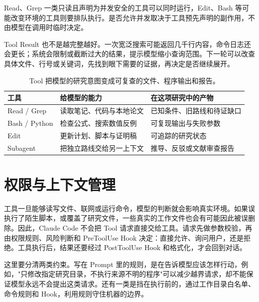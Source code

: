 Read、Grep 一类只读且声明为并发安全的工具可以同时运行，Edit、Bash 等可能改变环境的工具则要排队执行。是否允许并发取决于工具预先声明的副作用，不由模型在调用时临时决定。\cite{ch03inside}

Tool Result 也不是越完整越好。一次宽泛搜索可能返回几千行内容，命令日志还会更长；系统会限制或截断过大的结果，提示模型缩小查询范围。下一轮可以改查具体文件、行号或关键词，先找到眼下需要的证据，再决定是否继续展开。

\begin{table}[htbp]
\centering
\small
\setlength{\tabcolsep}{5pt}
\begin{tabular}{L{0.16\textwidth}L{0.30\textwidth}L{0.44\textwidth}}
\toprule
工具 & 给模型的能力 & 在这项研究中的产物 \\
\midrule
Read / Grep & 读取笔记、代码与本地论文 & 已知条件、旧路线和待证缺口 \\
Bash / Python & 检查公式、搜索数值反例 & 可复现输出与失败参数 \\
Edit & 更新计划、脚本与证明稿 & 可追踪的研究状态 \\
Subagent & 把独立路线交给另一上下文 & 推导、反驳或文献审查报告 \\
\bottomrule
\end{tabular}
\caption{Tool 把模型的研究意图变成可复查的文件、程序输出和报告。}
\label{tab:ch03-tools}
\end{table}

\FloatBarrier

\section{权限与上下文管理}

工具一旦能够读写文件、联网或运行命令，模型的判断就会影响真实环境。如果误执行了陌生脚本，或覆盖了研究文件，一些真实的工作文件也会有可能因此被误删除。因此，Claude Code 不会把 Tool 请求直接交给工具。请求先做参数校验，再由权限规则、风险判断和 PreToolUse Hook 决定：直接允许、询问用户，还是拒绝。工具执行后，结果还要经过 PostToolUse Hook 和格式化，才会回到对话。\cite{ch03inside}

这里要分清两类约束。写在 Prompt 里的规则，是在告诉模型应该怎样行动，例如，"只修改指定研究目录，不执行来源不明的程序"可以减少越界请求，却不能保证模型永远不会提出这类请求。还有一类是挡在执行前的，通过工作目录白名单、命令规则和 Hook，利用规则守住机器的边界。

